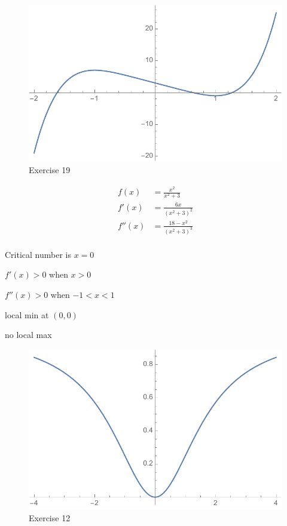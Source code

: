 \documentclass[letterpaper, landscape]{exam}
\begin{document}
\begin{description}
      \begin{figure}[H]
        \centering
        \includegraphics[scale = 0.6]{ex43_19.pdf}
        \caption{Exercise 19}
        \label{fig:ex_4.3_19}
      \end{figure}

    \newpage

    \item[12]
      \begin{align*}
        f(x)   & = \frac{x^2}{x^2 + 3} \\
        f'(x)  & = \frac{6x}{\left(x^2 + 3\right)^2} \\
        f''(x) & = \frac{ 18 - x^2 }{ \left(x^2 + 3 \right)^3 } \\
      \end{align*}

      \begin{itemize*}
        \item Critical number is $x = 0$ 
        \item $f'(x) > 0$ when $x > 0$ 
        \item $f''(x) > 0$ when $-1 < x < 1$ 
        \item local min at $(0, 0)$
        \item no local max
      \end{itemize*}

      \begin{figure}[H]
        \centering
        \includegraphics[scale = 0.6]{ex43_12.pdf}
        \caption{Exercise 12}
        \label{fig:ex_4.3_12}
      \end{figure}

  \end{description}
\end{document}
